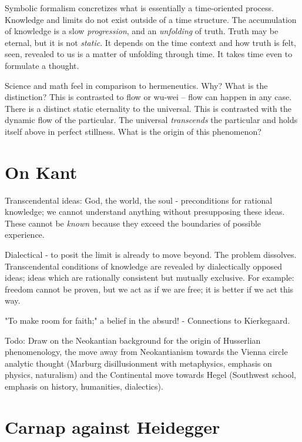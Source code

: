 \documentclass[leqno]{article}
\begin{document}
	Symbolic formalism concretizes what is essentially a time-oriented process.
	Knowledge and limits do not exist outside of a time structure. The accumulation
	of knowledge is a slow \emph{progression}, and an \emph{unfolding} of truth. Truth
	may be eternal, but it is not \emph{static}. It depends on the time context
	and how truth is felt, seen, revealed to us is a matter of unfolding through
	time. It takes time even to formulate a thought.

	Science and math feel  in comparison to hermeneutics. Why?
	What is the distinction? This is contrasted to flow or wu-wei -- flow can
	happen in any case. There is a distinct static eternality to the universal.
	This is contrasted with the dynamic flow of the particular. The universal \emph{transcends}
	the particular and holds itself above in perfect stillness. What is the origin
	of this phenomenon?

	\section{On Kant}

	Transcendental ideas: God, the world, the soul - preconditions for rational knowledge;
	we cannot understand anything without presupposing these ideas. These cannot be
	\emph{known} because they exceed the boundaries of possible experience.

	Dialectical - to posit the limit is already to move beyond. The problem dissolves.
	Transcendental conditions of knowledge are revealed by dialectically opposed
	ideas; ideas which are rationally consistent but mutually exclusive. For
	example: freedom cannot be proven, but we act as if we are free; it is better if
	we act this way.

	"To make room for faith;" a belief in the absurd! - Connections to Kierkegaard.

	Todo: Draw on the Neokantian background for the origin of Husserlian
	phenomenology, the move away from Neokantianism towards the Vienna circle analytic
	thought (Marburg disillusionment with metaphysics, emphasis on physics,
	naturalism) and the Continental move towards Hegel (Southwest school, emphasis
	on history, humanities, dialectics).

	\section{Carnap against Heidegger}
\end{document}
